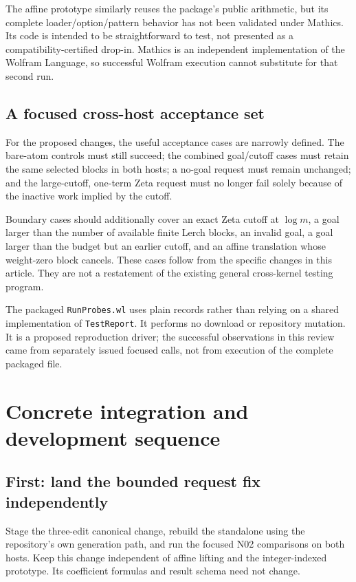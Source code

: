 \documentclass[11pt,letterpaper]{article}
\newcommand{\code}[1]{\nolinkurl{#1}}
\begin{document}
The affine prototype similarly reuses the package's public arithmetic, but its
complete loader/option/pattern behavior has not been validated under Mathics.
Its code is intended to be straightforward to test, not presented as a
compatibility-certified drop-in. Mathics is an independent implementation of
the Wolfram Language, so successful Wolfram execution cannot substitute for
that second run.~\cite{mathics-site}

\subsection{A focused cross-host acceptance set}
For the proposed changes, the useful acceptance cases are narrowly defined.
The bare-atom controls must still succeed; the combined goal/cutoff cases must
retain the same selected blocks in both hosts; a no-goal request must remain
unchanged; and the large-cutoff, one-term Zeta request must no longer fail solely
because of the inactive work implied by the cutoff.

Boundary cases should additionally cover an exact Zeta cutoff at $\log m$,
a goal larger than the number of available finite Lerch blocks, an invalid
goal, a goal larger than the budget but an earlier cutoff, and an affine
translation whose weight-zero block cancels. These cases follow from the
specific changes in this article. They are not a restatement of the existing
general cross-kernel testing program.

The packaged \code{RunProbes.wl} uses plain records rather than relying on a
shared implementation of \code{TestReport}. It performs no download or
repository mutation. It is a proposed reproduction driver; the successful
observations in this review came from separately issued focused calls, not
from execution of the complete packaged file.

\section{Concrete integration and development sequence}
\subsection{First: land the bounded request fix independently}
Stage the three-edit canonical change, rebuild the standalone using the
repository's own generation path, and run the focused N02 comparisons on both
hosts. Keep this change independent of affine lifting and the integer-indexed
prototype. Its coefficient formulas and result schema need not change.
\end{document}
